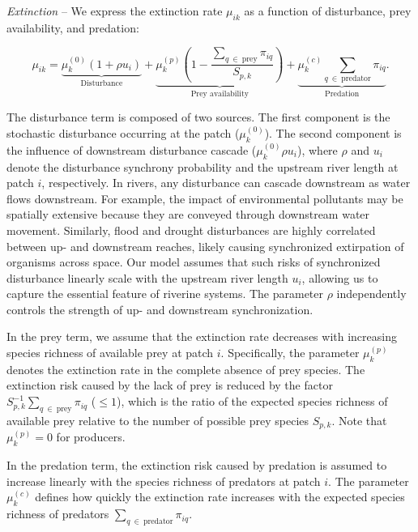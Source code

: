 \documentclass[11pt, class=article, crop=false]{standalone}
\begin{document}
\textit{Extinction} -- 
We express the extinction rate $\mu_{ik}$ as a function of disturbance, prey availability, and predation:

\begin{equation}
    \mu_{ik} = 
        \underbrace{\mu_{k}^{(0)} (1 + \rho u_i)}_{\text{Disturbance}} + 
        \underbrace{\mu_{k}^{(p)} \left(1 - \frac{\sum_{q~\in~\text{prey}} \pi_{iq}}{S_{p, k}} \right)}_{\text{Prey availability}} + 
        \underbrace{\mu_{k}^{(c)} \sum_{q~\in~\text{predator}} \pi_{iq}}_{\text{Predation}}.
    \label{eq:extn}
\end{equation}

The disturbance term is composed of two sources.
The first component is the stochastic disturbance occurring at the patch ($\mu_{k}^{(0)}$).
The second component is the influence of downstream disturbance cascade ($\mu_{k}^{(0)} \rho u_i$), where $\rho$ and $u_i$ denote the disturbance synchrony probability and the upstream river length at patch $i$, respectively.
In rivers, any disturbance can cascade downstream as water flows downstream.
For example, the impact of environmental pollutants may be spatially extensive because they are conveyed through downstream water movement.
Similarly, flood and drought disturbances are highly correlated between up- and downstream reaches, likely causing synchronized extirpation of organisms across space.
Our model assumes that such risks of synchronized disturbance linearly scale with the upstream river length $u_i$, allowing us to capture the essential feature of riverine systems.
The parameter $\rho$ independently controls the strength of up- and downstream synchronization.

In the prey term, we assume that the extinction rate decreases with increasing species richness of available prey at patch $i$.
Specifically, the parameter $\mu_{k}^{(p)}$ denotes the extinction rate in the complete absence of prey species.
The extinction risk caused by the lack of prey is reduced by the factor $S_{p, k}^{-1} \sum_{q~\in~\text{prey}} \pi_{iq}$ ($\le 1$), which is the ratio of the expected species richness of available prey relative to the number of possible prey species $S_{p, k}$.
Note that $\mu_{k}^{(p)} = 0$ for producers.

In the predation term, the extinction risk caused by predation is assumed to increase linearly with the species richness of predators at patch $i$.
The parameter $\mu_{k}^{(c)}$ defines how quickly the extinction rate increases with the expected species richness of predators $\sum_{q~\in~\text{predator}} \pi_{iq}$.
\end{document}
